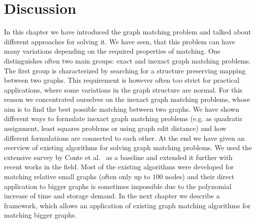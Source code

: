 
\section{Discussion}
In this chapter we have introduced the graph matching problem and talked about different approaches for solving it. We have seen, that this problem can have many variations depending on the required properties of matching. One distinguishes often two main groups: exact and inexact graph matching problems. The first group is characterized by searching for a structure preserving mapping between two graphs. This requirement is however often too strict for practical applications, where some variations in the graph structure are normal. For this reason we concentrated ourselves on the inexact graph matching problems, whose aim is to find the best possible matching between two graphs. We have shown different ways to formulate inexact graph matching problems (e.g. as quadratic assignment, least squares problems or using graph edit distance) and how different formulations are connected to each other. At the end we have given an overview of existing algorithms for solving graph matching problems. We used the extensive survey by Conte et al.~\cite{Conte2004} as a baseline and extended it further with recent works in the field. Most of the existing algorithms were developed for matching relative small graphs (often only up to $100$ nodes) and their direct application to bigger graphs is sometimes impossible due to the polynomial increase of time and storage demand. 
In the next chapter we describe a framework, which allows an application of existing graph matching algorithms for matching bigger graphs.
